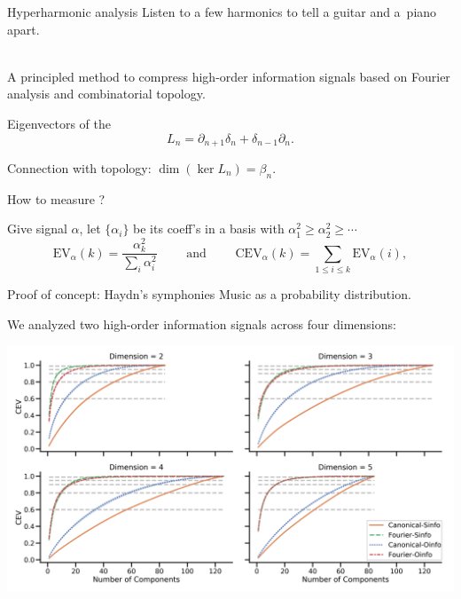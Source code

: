 \begin{frame}{Hyperharmonic analysis}
	\pause
	 Listen to a few harmonics to tell a guitar and a~piano apart.

	\pause\bigskip
	\\
	A principled method to compress high-order information signals based on Fourier analysis and combinatorial topology.

	\pause\bigskip
	 Eigenvectors of the 
	\[
	\displaystyle{L_n = \partial_{n+1} \delta_n + \delta_{n-1} \partial_{n}}.
	\]

	\pause
	Connection with topology: $\dim(\ker L_n) = \beta_n$.

	\pause\medskip
	How to measure ?

	\pause\medskip
	Give signal $\alpha$, let $\{\alpha_i\}$ be its coeff's in a basis with $\alpha_1^2 \geq \alpha_2^2 \geq \cdots$
	\begin{equation*}
		\text{EV}_{\alpha}(k) = \frac{ \alpha_k^2}{{\displaystyle \sum_{i} \alpha_i^2}}
		\qquad \text{ and } \qquad
		\text{CEV}_{\alpha}(k) = \sum_{1\leq i \leq k} \text{EV}_{\alpha}(i),
	\end{equation*}
\end{frame}

\begin{frame}{Proof of concept: Haydn's symphonies}
	\pause\vskip -5pt
	Music as a probability distribution.

	\pause\vskip 5pt
	We analyzed two high-order information signals across four dimensions:%

	\pause\vskip 7pt
	\hspace*{-15pt}
	\includegraphics[scale=.096]{aux/hyperharmonic}
\end{frame}